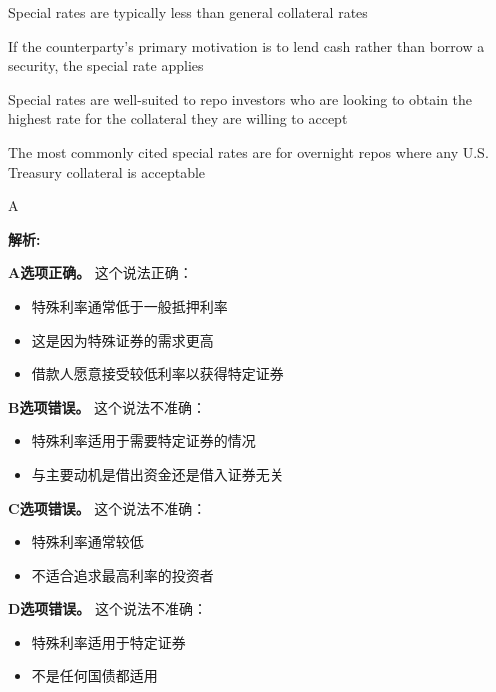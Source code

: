 \documentclass{article}
\newenvironment{explanation}
{\textbf{解析:}\par}
{\par}
\begin{document}
\begin{choices}
    \item Special rates are typically less than general collateral rates
    \item If the counterparty's primary motivation is to lend cash rather than borrow a security, the special rate applies
    \item Special rates are well-suited to repo investors who are looking to obtain the highest rate for the collateral they are willing to accept
    \item The most commonly cited special rates are for overnight repos where any U.S. Treasury collateral is acceptable
\end{choices}

\begin{correctanswer}
    A
\end{correctanswer}

\begin{explanation}
    \textbf{A选项正确。}
    这个说法正确：
    \begin{itemize}
        \item 特殊利率通常低于一般抵押利率
        \item 这是因为特殊证券的需求更高
        \item 借款人愿意接受较低利率以获得特定证券
    \end{itemize}

    \textbf{B选项错误。}
    这个说法不准确：
    \begin{itemize}
        \item 特殊利率适用于需要特定证券的情况
        \item 与主要动机是借出资金还是借入证券无关
    \end{itemize}

    \textbf{C选项错误。}
    这个说法不准确：
    \begin{itemize}
        \item 特殊利率通常较低
        \item 不适合追求最高利率的投资者
    \end{itemize}

    \textbf{D选项错误。}
    这个说法不准确：
    \begin{itemize}
        \item 特殊利率适用于特定证券
        \item 不是任何国债都适用
    \end{itemize}
\end{explanation}
\end{document}
